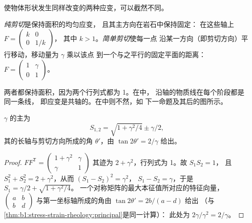 使物体形状发生同样改变的两种应变，可以截然不同。

\begin{definition}\label{def:b1:stress-strain-rheology:shear-types}
\emph{纯剪切}是保持面积的均匀应变，
且其主方向在岩石中保持固定：
在这些轴上 $F = \begin{pmatrix} k & 0 \\ 0 & 1/k\end{pmatrix}$，
其中 $k > 1$。\emph{简单剪切}使每一点
沿某一方向（即剪切方向）平行移动，移动量为 $\gamma$ 乘以该点
到一个与之平行的固定平面的距离：
$F = \begin{pmatrix} 1 & \gamma \\ 0 & 1\end{pmatrix}$。
\end{definition}

两者都保持面积，因为两个行列式都为 1。在中，
沿轴的物质线在每个阶段都是同一条线，
即应变是共轴的。在中则不然，如
下一命题及其后的图所示。

\begin{proposition}[简单剪切的椭圆]\label{prop:b1:stress-strain-rheology:simple-shear}
 $\gamma$ 的主为
\[
  S_{1,2} = \sqrt{1 + \gamma^2/4} \pm \gamma/2 ,
\]
其的长轴与剪切方向所成的角
$\theta'$，由 $\tan2\theta' = 2/\gamma$ 给出。
\end{proposition}

\begin{proof}
$FF^{\mathsf T} = \begin{pmatrix} 1+\gamma^2 & \gamma \\ \gamma & 1\end{pmatrix}$
其迹为 $2+\gamma^2$，行列式为 1。故 $S_1S_2 = 1$，
且 $S_1^2 + S_2^2 = 2 + \gamma^2$，从而 $(S_1 - S_2)^2 = \gamma^2$，
$S_1 - S_2 = \gamma$，于是 $S_1 = \gamma/2 + \sqrt{1+\gamma^2/4}$。
一个对称矩阵的最大本征值所对应的特征向量，
$\begin{pmatrix} a & b \\ b & d\end{pmatrix}$ 与第一坐标轴所成的角由 $\tan2\theta' = 2b/(a-d)$ 给出
（与\cref{thm:b1:stress-strain-rheology:principal}是同一计算）：
此处为 $2\gamma/\gamma^2 = 2/\gamma$。
\end{proof}

